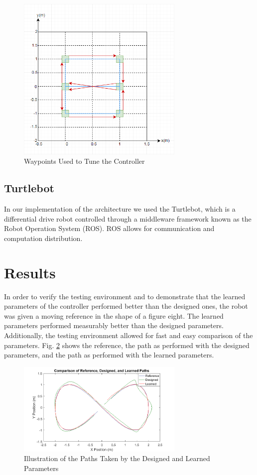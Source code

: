 \documentclass[conference]{IEEEtran}
\begin{document}
\begin{figure}[tb]
\centering
\includegraphics[width=80mm]{Env.PNG}
\caption{Waypoints Used to Tune the Controller}
\label{fig:Env}
\end{figure} 

\subsection{Turtlebot}

In our implementation of the architecture we used the Turtlebot, which is a differential drive robot controlled through a middleware framework known as the Robot Operation System (ROS). ROS allows for communication and computation distribution.

\section{Results} \label{sec:Results}

In order to verify the testing environment and to demonstrate that the learned parameters of the controller performed better than the designed ones, the robot was given a moving reference in the shape of a figure eight. The learned parameters performed measurably better than the designed parameters. Additionally, the testing environment allowed for fast and easy comparison of the parameters. Fig. \ref{fig:Path} shows the reference, the path as performed with the designed parameters, and the path as performed with the learned parameters.

\begin{figure}[tb]
\centering
\includegraphics[width=80mm]{Path.png}
\caption{Illustration of the Paths Taken by the Designed and Learned Parameters}
\label{fig:Path}
\end{figure} 
\end{document}
